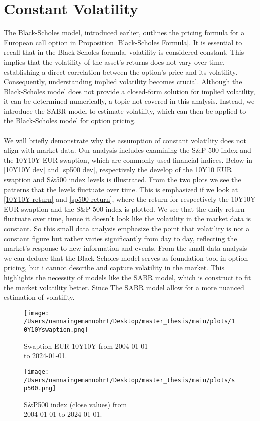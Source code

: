 \section{Constant Volatility}
The Black-Scholes model, introduced earlier, outlines the pricing formula for a European call option in 
Proposition \autoref{Black-Scholes Formula}. It is  essential to recall that in the Black-Scholes formula, 
volatility is considered constant. This implies that the volatility of the asset's returns does not vary over time,
establishing a direct correlation between the option's price and its volatility. Consequently, 
understanding implied volatility becomes crucial. Although the Black-Scholes model does not provide 
a closed-form solution for implied volatility, it can be determined numerically, a topic not covered 
in this analysis. Instead, we introduce the SABR model to estimate volatility, which can then be 
applied to the Black-Scholes model for option pricing.
\\\\
We will briefly demonstrate why the assumption of constant volatility does not align with market data. 
Our analysis includes examining the S$\&$P 500 index and the 10Y10Y EUR swaption, which are commonly used financial indices.
Below in \autoref{10Y10Y dev} and \autoref{sp500 dev}, respectively the develop of the 10Y10 EUR swaption and S$\&$500 index
levels is illustrated. From the two plots we see the patterns that the levels fluctuate over time. This is emphasized
if we look at \autoref{10Y10Y return} and \autoref{sp500 return}, where the return for respectively the 10Y10Y EUR 
swaption and the S$\&$P 500 index is plotted. We see that the daily return fluctuate over time, hence it doesn't look 
like the volatility in the market data is constant. So this small data analysis emphasize the point that volatility is 
not a constant figure but rather varies significantly from day to day, reflecting the market's 
response to new information and events. From the small data analysis we can deduce that the Black Scholes model 
serves as foundation tool in option pricing, but i cannot describe and capture volatility in the market. This highlights 
the necessity of models like the SABR model, which is construct to fit the market volatility better. Since The SABR model
allow for a more nuanced estimation of volatility.
\newpage
\begin{figure}[h]
    \centering
    \begin{minipage}{0.5\textwidth}
        \texttt{[image: /Users/nannaingemannohrt/Desktop/master\_thesis/main/plots/10Y10Yswaption.png]}
        \caption{Swaption EUR 10Y10Y from  2004-01-01 \\ to 2024-01-01.}
        \label{10Y10Y dev}
    \end{minipage}\hfill 
    \begin{minipage}{0.5\textwidth}
        \texttt{[image: /Users/nannaingemannohrt/Desktop/master\_thesis/main/plots/sp500.png]}
        \caption{S$\&$P500 index (close values) from \\ 2004-01-01 to 2024-01-01.}
        \label{sp500 dev}
    \end{minipage}
\end{figure}

